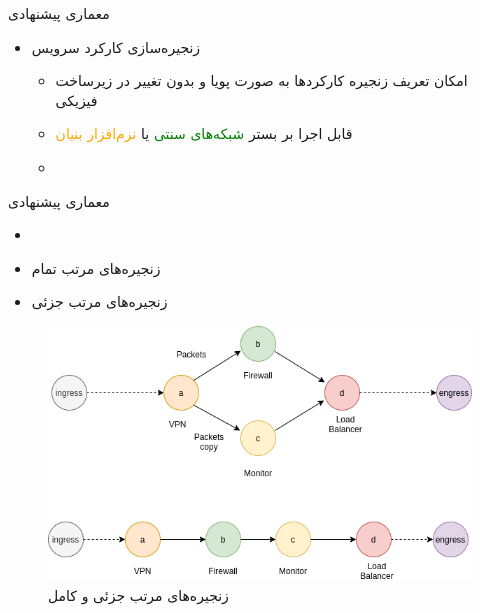 \documentclass{beamer}
\makeatletter
\newcommand{\RTList}{\raggedleft\rightskip\@totalleftmargin}
\makeatother
\begin{document}
\begin{persian}
	\begin{frame}{معماری پیشنهادی}
		\begin{itemize}\RTList{}
			\justifying
			\item زنجیره‌سازی کارکرد سرویس
			      \begin{itemize}\RTList{}
				      \item امکان تعریف زنجیره کارکردها به صورت پویا و بدون تغییر در زیرساخت فیزیکی
				      \item قابل اجرا بر بستر \textcolor{green}{شبکه‌های سنتی} یا \textcolor{orange}{نرم‌افزار بنیان}
				      \item {}
			      \end{itemize}
		\end{itemize}
	\end{frame}

	\begin{frame}{معماری پیشنهادی}
		\begin{itemize}\RTList{}
			\justifying
			\item \cite{Yang2021}
			\item زنجیره‌های مرتب تمام
			\item زنجیره‌های مرتب جزئی
		\end{itemize}
		\begin{center}\begin{figure}
				\includegraphics[scale=0.3]{images/partially-totally-sfc.png}
				\caption{زنجیره‌های مرتب جزئی و کامل}
			\end{figure}\end{center}
	\end{frame}


\end{persian}
\end{document}
